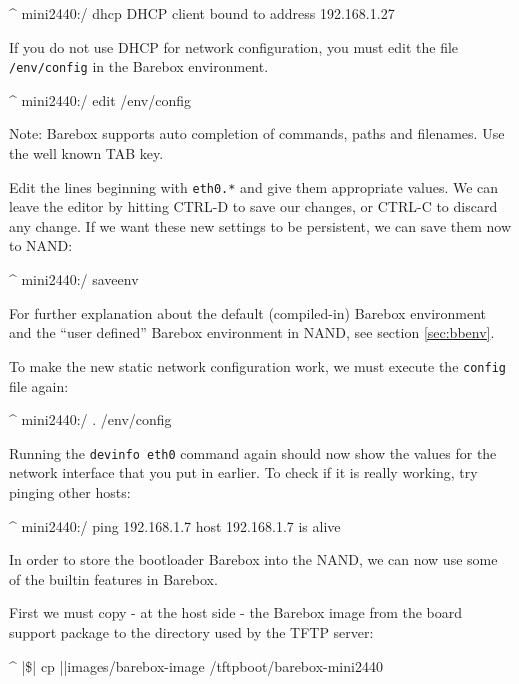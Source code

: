 \begin{ptxshell}[escapechar=|]{^}
mini2440:/ dhcp
DHCP client bound to address 192.168.1.27
\end{ptxshell}

If you do not use DHCP for network configuration, you must edit the file
\texttt{/env/config} in the Barebox environment.

\begin{ptxshell}[escapechar=|]{^}
mini2440:/ edit /env/config
\end{ptxshell}

Note: Barebox supports auto completion of commands, paths and filenames. Use
the well known TAB key.

Edit the lines beginning with \texttt{eth0.*} and give them appropriate values.
We can leave the editor by hitting CTRL-D to save our changes, or CTRL-C to
discard any change. If we want these new settings to be persistent, we can save
them now to NAND:

\begin{ptxshell}[escapechar=|]{^}
mini2440:/ saveenv
\end{ptxshell}

For further explanation about the default (compiled-in) Barebox environment
and the “user defined” Barebox environment in NAND, see section \ref{sec:bbenv}.

To make the new static network configuration work, we must execute the
\texttt{config} file again:

\begin{ptxshell}[escapechar=|]{^}
mini2440:/ . /env/config
\end{ptxshell}

Running the \texttt{devinfo eth0} command again should now show the values for
the network interface that you put in earlier. To check if it is really working,
try pinging other hosts:

\begin{ptxshell}[escapechar=|]{^}
mini2440:/ ping 192.168.1.7
host 192.168.1.7 is alive
\end{ptxshell}

In order to store the bootloader Barebox into the NAND, we can now use
some of the builtin features in Barebox.

First we must copy - at the host side - the Barebox image from the board support
package to the directory used by the TFTP server:

\begin{ptxshell}[escapechar=|]{^}
|\$| cp |\ptxdistPlatformDir |images/barebox-image /tftpboot/barebox-mini2440
\end{ptxshell}

